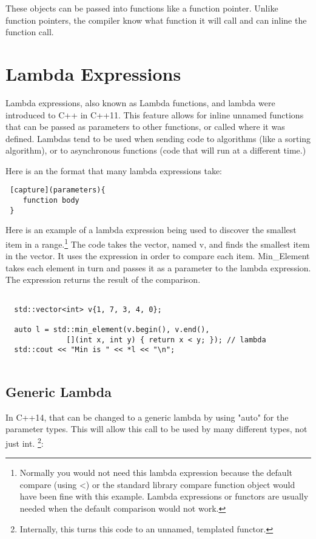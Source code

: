 These objects can be passed into functions like a function
pointer. Unlike function pointers, the compiler know what
function it will call and can inline the function call.
\section{Lambda Expressions}
Lambda expressions, also known as Lambda functions, and lambda were introduced to C++ in C++11.
This feature allows for inline unnamed functions that can be passed as parameters to other functions, or called where it was defined. Lambdas tend to be used when sending code to algorithms (like a sorting algorithm), or to asynchronous functions (code that will run at a different time.)

Here is an the format that many lambda expressions take:
\begin{verbatim}
 [capture](parameters){
    function body
 }
\end{verbatim}

Here is an example of a lambda expression being used to discover the smallest item in a range.\footnote{Normally you would not need this lambda expression because the default compare (using \textless) or the standard library compare function object would have been fine with this example. Lambda expressions or functors are usually needed when the default comparison would not work.} The code takes the vector, named v, and finds the smallest
item in the vector. It uses the expression in order to compare each item. Min\_Element
takes each element in turn and passes it as a parameter to the lambda expression. The
expression returns the result of the comparison.

\begin{lstlisting}

  std::vector<int> v{1, 7, 3, 4, 0};

  auto l = std::min_element(v.begin(), v.end(), 
              [](int x, int y) { return x < y; }); // lambda
  std::cout << "Min is " << *l << "\n";
  
\end{lstlisting}

\subsection{Generic Lambda}
In C++14, that can be changed to a generic lambda by using "auto" for the parameter types. This will allow this call to be used by many different types, not just int. \footnote{Internally, this turns this code to an unnamed, templated functor.}:


